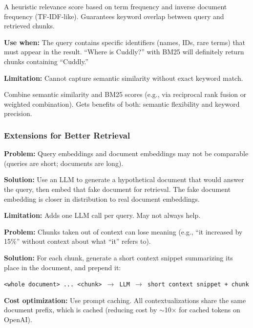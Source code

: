 \documentclass[11pt, a4paper]{article}
\begin{document}
\begin{defbox}
A heuristic relevance score based on term frequency and inverse document frequency (TF-IDF-like). Guarantees keyword overlap between query and retrieved chunks.

\textbf{Use when:} The query contains specific identifiers (names, IDs, rare terms) that must appear in the result. ``Where is Cuddly?'' with BM25 will definitely return chunks containing ``Cuddly.''

\textbf{Limitation:} Cannot capture semantic similarity without exact keyword match.
\end{defbox}

\begin{defbox}
Combine semantic similarity and BM25 scores (e.g., via reciprocal rank fusion or weighted combination). Gets benefits of both: semantic flexibility and keyword precision.
\end{defbox}

\subsubsection{Extensions for Better Retrieval}

\begin{defbox}
\textbf{Problem:} Query embeddings and document embeddings may not be comparable (queries are short; documents are long).

\textbf{Solution:} Use an LLM to generate a hypothetical document that would answer the query, then embed that fake document for retrieval. The fake document embedding is closer in distribution to real document embeddings.

\textbf{Limitation:} Adds one LLM call per query. May not always help.
\end{defbox}

\begin{defbox}
\textbf{Problem:} Chunks taken out of context can lose meaning (e.g., ``it increased by 15\%'' without context about what ``it'' refers to).

\textbf{Solution:} For each chunk, generate a short context snippet summarizing its place in the document, and prepend it:
\begin{center}
\texttt{<whole document> ... <chunk> $\to$ LLM $\to$ short context snippet + chunk}
\end{center}

\textbf{Cost optimization:} Use prompt caching. All contextualizations share the same document prefix, which is cached (reducing cost by $\sim$10$\times$ for cached tokens on OpenAI).
\end{defbox}
\end{document}
